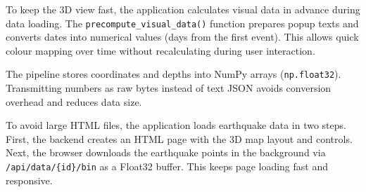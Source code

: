 To keep the 3D view fast, the application calculates visual data in advance during data loading. The \texttt{precompute\_\allowbreak visual\_\allowbreak data()} function prepares popup texts and converts dates into numerical values (days from the first event). This allows quick colour mapping over time without recalculating during user interaction.

The pipeline stores coordinates and depths into NumPy arrays (\texttt{np.float32}). Transmitting numbers as raw bytes instead of text JSON avoids conversion overhead and reduces data size.

To avoid large HTML files, the application loads earthquake data in two steps. First, the backend creates an HTML page with the 3D map layout and controls. Next, the browser downloads the earthquake points in the background via \texttt{/api/\allowbreak data/\allowbreak\{id\}/\allowbreak bin} as a Float32 buffer. This keeps page loading fast and responsive.

